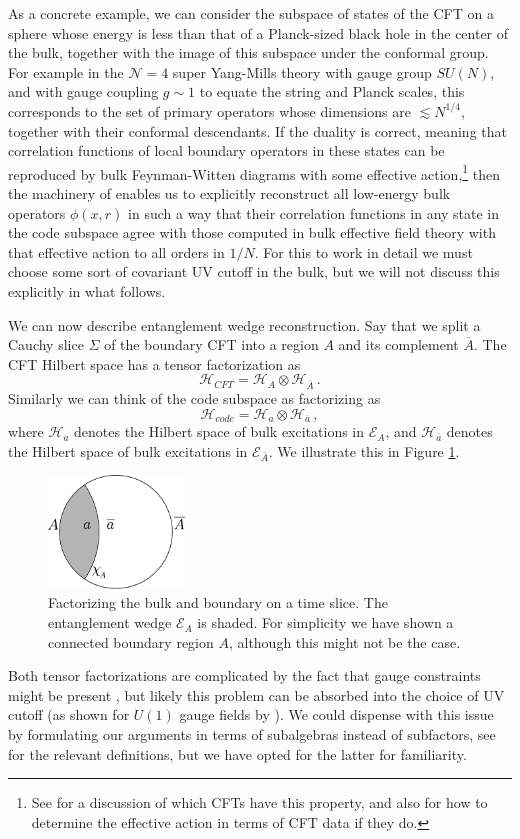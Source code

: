 \documentclass[aps,prl,twocolumn,nofootinbib,longbibliography,superscriptaddress]{revtex4-1}
\newcommand{\be}{\begin{equation}}
\newcommand{\ee}{\end{equation}}
\newcommand{\EA}{\mathcal{E}_A}
\newcommand{\Ab}{\overline{A}}
\newcommand{\HA}{\mathcal{H}_A}
\newcommand{\HAb}{\mathcal{H}_{\overline{A}}}
\newcommand{\Hc}{\mathcal{H}_{code}}
\newcommand{\Ha}{\mathcal{H}_a}
\newcommand{\Hab}{\mathcal{H}_{\overline{a}}}
\newcommand{\bfig}{\begin{figure}\begin{center}}
\newcommand{\efig}{\end{center}\end{figure}}
\begin{document}
As a concrete example, we can consider the subspace of states of the CFT on a sphere whose energy is less than that of a Planck-sized black hole in the center of the bulk, together with the image of this subspace under the conformal group.  For example in the $\mathcal{N}=4$ super Yang-Mills theory with gauge group $SU(N)$, and with gauge coupling $g\sim 1$ to equate the string and Planck scales, this corresponds to the set of primary operators whose dimensions are $\lesssim N^{1/4}$, together with their conformal descendants.  If the duality is correct, meaning that correlation functions of local boundary operators in these states can be reproduced by bulk Feynman-Witten diagrams with some effective action,\footnote{See \cite{Heemskerk:2009pn} for a discussion of which CFTs have this property, and also for how to determine the effective action in terms of CFT data if they do.} then the machinery of \cite{Banks:1998dd,Hamilton:2006az,Kabat:2011rz,Heemskerk:2012mn,Kabat:2012hp,Heemskerk:2012np,Morrison:2014jha} enables us to explicitly reconstruct all low-energy bulk operators $\phi(x,r)$ in such a way that their correlation functions in any state in the code subspace agree with those computed in bulk effective field theory with that effective action to all orders in $1/N$.  For this to work in detail we must choose some sort of covariant UV cutoff in the bulk, but we will not discuss this explicitly in what follows.

We can now describe entanglement wedge reconstruction.  Say that we split a Cauchy slice $\Sigma$ of the boundary CFT into a region $A$ and its complement $\Ab$.  The CFT Hilbert space has a tensor factorization as
\be
\mathcal{H}_{CFT}=\HA\otimes \HAb \,.
\ee
Similarly we can think of the code subspace as factorizing as
\be\label{codefactor}
\Hc=\Ha\otimes \Hab \,,
\ee
where $\Ha$ denotes the Hilbert space of bulk excitations in $\EA$, and $\Hab$ denotes the Hilbert space of bulk excitations in $\mathcal{E}_{\overline{A}}$.  We illustrate this in Figure \ref{fig}.
\bfig
\includegraphics[height=3cm]{figure.pdf}
\caption{Factorizing the bulk and boundary on a time slice.  The entanglement wedge $\EA$ is shaded.  For simplicity we have shown a connected boundary region $A$, although this might not be the case. }\label{fig}
\efig
Both tensor factorizations are complicated by the fact that gauge constraints might be present \cite{Donnelly:2011hn,Casini:2013rba,Donnelly:2014fua,Donnelly:2015hxa,Radicevic:2015sza,Soni:2015yga,Ma:2015xes,Donnelly:2016auv}, but likely this problem can be absorbed into the choice of UV cutoff (as shown for $U(1)$ gauge fields by \cite{Harlow:2015lma}).  We could dispense with this issue by formulating our arguments in terms of subalgebras instead of subfactors, see \cite{Casini:2013rba} for the relevant definitions, but we have opted for the latter for familiarity.
\end{document}
